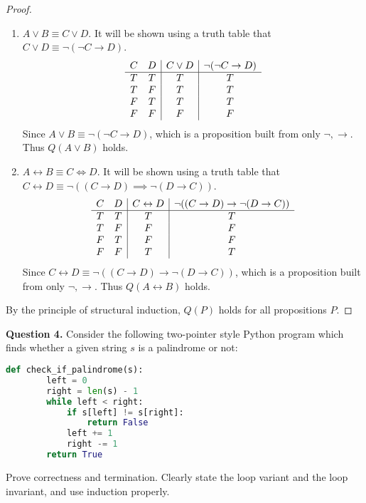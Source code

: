 \documentclass[11pt]{article}
\begin{document}
\begin{proof}
\begin{enumerate}
            \item \(A \lor B \equiv C \lor D\). It will be shown using a truth table that \(C \lor D \equiv \neg(\neg C \rightarrow D)\).
            \begin{displaymath}
                \begin{array}{c c | c | c}
                    C & D & C \lor D & \neg(\neg C \rightarrow D)\\
                    \hline
                    T & T & T & T\\
                    T & F & T & T\\
                    F & T & T & T\\
                    F & F & F & F\\
                \end{array}
            \end{displaymath}
            Since \(A \lor B \equiv \neg(\neg C \rightarrow D)\), which is a proposition built from only \(\neg, \rightarrow\). Thus \(Q(A \lor B)\) holds.

            \item \(A \leftrightarrow B \equiv C \iff D\). It will be shown using a truth table that \(C \leftrightarrow D \equiv \neg((C \rightarrow D) \implies \neg(D \rightarrow C))\).
            \begin{displaymath}
                \begin{array}{c c | c | c}
                    C & D & C \leftrightarrow D & \neg((C \rightarrow D) \rightarrow \neg(D \rightarrow C))\\
                    \hline
                    T & T & T & T\\
                    T & F & F & F\\
                    F & T & F & F\\
                    F & F & T & T\\
                \end{array}
            \end{displaymath}
            Since \(C \leftrightarrow D \equiv \neg((C \rightarrow D) \rightarrow \neg(D \rightarrow C))\), which is a proposition built from only \(\neg, \rightarrow\). Thus \(Q(A \leftrightarrow B)\) holds.
        \end{enumerate}
        By the principle of structural induction, \(Q(P)\) holds for all propositions \(P\).
        
    \end{proof}
    \pagebreak
    \noindent\textbf{Question 4.} Consider the following two-pointer style Python program which finds whether a given string $s$ is a palindrome or not:
    \begin{lstlisting}[language=Python]
    def check_if_palindrome(s):
        left = 0
        right = len(s) - 1
        while left < right:
            if s[left] != s[right]:
                return False
            left += 1
            right -= 1
        return True
    \end{lstlisting}
    Prove correctness and termination. Clearly state the loop variant and the loop invariant, and use induction properly.
    
\end{document}
